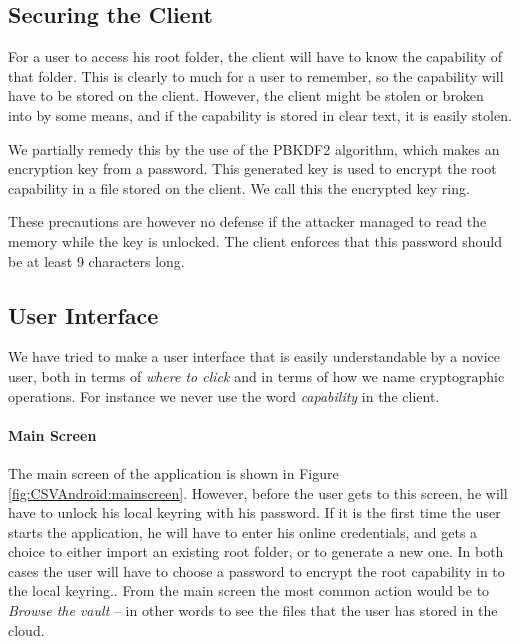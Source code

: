\documentclass[pdftex,english,10pt,b5paper,twoside]{book}
\begin{document}
\subsection{Securing the Client}

For a user to access his root folder, the client will have to know the
capability of that folder. This is clearly to much for a user to remember, so
the capability will have to be stored on the client. However, the client might
be stolen or broken into by some means, and if the capability is stored in clear
text, it is easily stolen.

We partially remedy this by the use of the \ac{PBKDF2} algorithm, which makes an
encryption key from a password. This generated key is used to encrypt the root
capability in a file stored on the client. We call this the encrypted key ring.

These precautions are however no defense if the attacker managed to read the
memory while the key is unlocked. The client enforces that this password should
be at least 9 characters long.

\subsection{User Interface}

We have tried to make a user interface that is easily understandable by a novice
user, both in terms of \emph{where to click} and in terms of how we name
cryptographic operations. For instance we never use the word \emph{capability}
in the client.

\paragraph{Main Screen}

The main screen of the application is shown in Figure
\ref{fig:CSVAndroid:mainscreen}. However, before the user gets to this screen,
he will have to unlock his local keyring with his password. If it is the first
time the user starts the application, he will have to enter his online
credentials, and gets a choice to either import an existing root folder, or to
generate a new one. In both cases the user will have to choose a password to
encrypt the root capability in to the local keyring.. From the main screen the
most common action would be to \emph{Browse the vault} -- in other words to see
the files that the user has stored in the cloud.
\end{document}
